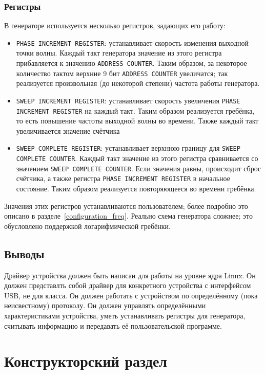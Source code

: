 \documentclass[a4paper,12pt]{report}
\numberwithin{equation}{section}
\begin{document}
\subsubsection{Регистры}
В генераторе используется несколько регистров, задающих его работу:
\begin{itemize}
\item \texttt{PHASE INCREMENT REGISTER}: устанавливает скорость изменения
  выходной точки волны. Каждый такт генератора значение из этого регистра
  прибавляется к значению \texttt{ADDRESS COUNTER}. Таким образом, за некоторое
  количество тактом верхние 9 бит \texttt{ADDRESS COUNTER} увеличатся; так
  реализуется произвольная (до некоторой степени) частота работы генератора.
\item \texttt{SWEEP INCREMENT REGISTER}: устанавливает скорость увеличения
  \texttt{PHASE INCREMENT REGISTER} на каждый такт. Таким образом реализуется
  гребёнка, то есть повышение частоты выходной волны во времени. Также каждый
  такт увеличивается значение счётчика 
\item \texttt{SWEEP COMPLETE REGISTER}: устанавливает верхнюю границу для
  \texttt{SWEEP COMPLETE COUNTER}. Каждый такт значение из этого регистра
  сравнивается со значением \texttt{SWEEP COMPLETE COUNTER}. Если значения
  равны, происходит сброс счётчика, а также регистра \texttt{PHASE INCREMENT
    REGISTER} в начальное состояние. Таким образом реализуется повторяющееся во
  времени гребёнка.
\end{itemize}
Значения этих регистров устанавливаются пользователем; более подробно это
описано в разделе~\ref{configuration_freq}. Реально схема генератора сложнее;
это обусловлено поддержкой логарифмической гребёнки.

\subsection{Выводы}
Драйвер устройства должен быть написан для работы на уровне ядра Linux. Он
должен представлть собой драйвер для конкретного устройства с интерфейсом USB,
не для класса. Он должен работать с устройством по определённому (пока
неисвестному) протоколу. Он должен управлять определёнными характеристиками
устройства, уметь устанавливать регистры для генератора, считывать информацию и
передавать её пользовательской программе.

\newpage
\section{Конструкторский раздел}
\end{document}
